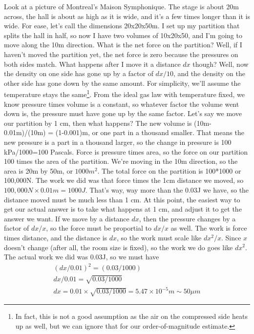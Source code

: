 \documentclass[letterpaper,11pt,preprint]{aastex}
\begin{document}
Look at a picture of Montreal's Maison Symphonique.  The stage is
about 20m across, the hall is about as high as it is wide, and it's a
few times longer than it is wide.  For ease, let's call the dimensions
20x20x50m.  I set up my partition that splits the hall in half, so now
I have two volumes of 10x20x50, and I'm going to move along the 10m
direction.  What is the net force on the partition?  Well, if I
haven't moved the partition yet, the net force is zero because the
pressures on both sides match.  What happens after I move it a
distance $dx$ though?  Well, now the density on one side has gone up
by a factor of $dx/10$, and the density on the other side has gone
down by the same amount.  For simplicity, we'll assume the temperature
stays the same\footnote{In fact, this is not a good assumption as the
air on the compressed side heats up as well, but we can ignore that
for our order-of-magnitude estimate.}.  From the ideal gas law with
temperature fixed, we know pressure times volume is a constant, so
whatever factor the volume went down is, the pressure must have gone
up by the same factor.  Let's say we  move our partition by 1 cm, then
what happens?  The new volume is (10m-0.01m)/(10m) = (1-0.001)m, or
one part in a thousand smaller.  That means the new pressure is a part
in a thousand larger, so the change in pressure is 100 kPa/1000=100
Pascals.  Force is pressure times area, so the force on our partition
100 times the area of the partition.  We're moving in the 10m
direction, so the area is 20m by 50m, or $1000m^2$.  The total force
on the partition is 100*1000 or 100,000N.  The work we did was that
force times the 1cm distance we moved, so $100,000N \times 0.01m =
1000J$.  That's way, way more than the 0.03J we have, so the distance
moved must be much less than 1 cm.  At this point, the easiest way to
get our actual answer is to take what happens at 1 cm, and adjust it
to get the answer we want.  If we move by a distance $dx$, then the
pressure changes by a factor of $dx/x$, so the force must be
proportial to $dx/x$ as well.  The work is force times distance, and
the distance is $dx$, so the work must scale like $dx^2/x$.  Since $x$
doesn't change (after all, the room size is fixed), so the work we do
goes like $dx^2$.  The actual work we did was 0.03J, so we must have
\begin{eqnarray}
  (dx/0.01)^2 = (0.03/1000) \\
  dx/0.01 = \sqrt{0.03/1000}\\
  dx=0.01\times \sqrt{0.03/1000}=5.47\times 10^{-5}m \sim 50 \mu m
\end{eqnarray}
\end{document}
